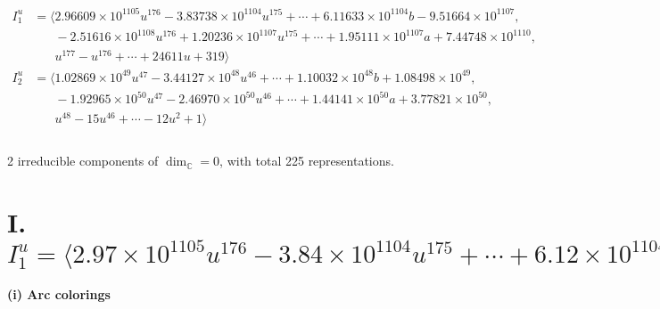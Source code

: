 \documentclass[1p]{elsarticle_modified}
\theoremstyle{definition}
\begin{document}
\begin{align*}
I^u_{1}&=\langle 
2.96609\times10^{1105} u^{176}-3.83738\times10^{1104} u^{175}+\cdots+6.11633\times10^{1104} b-9.51664\times10^{1107},\\
\phantom{I^u_{1}}&\phantom{= \langle  }-2.51616\times10^{1108} u^{176}+1.20236\times10^{1107} u^{175}+\cdots+1.95111\times10^{1107} a+7.44748\times10^{1110},\\
\phantom{I^u_{1}}&\phantom{= \langle  }u^{177}- u^{176}+\cdots+24611 u+319\rangle \\
I^u_{2}&=\langle 
1.02869\times10^{49} u^{47}-3.44127\times10^{48} u^{46}+\cdots+1.10032\times10^{48} b+1.08498\times10^{49},\\
\phantom{I^u_{2}}&\phantom{= \langle  }-1.92965\times10^{50} u^{47}-2.46970\times10^{50} u^{46}+\cdots+1.44141\times10^{50} a+3.77821\times10^{50},\\
\phantom{I^u_{2}}&\phantom{= \langle  }u^{48}-15 u^{46}+\cdots-12 u^2+1\rangle \\
\\
\end{align*}
\raggedright * 2 irreducible components of $\dim_{\mathbb{C}}=0$, with total 225 representations.\\
\newpage
\renewcommand{\arraystretch}{1}
\centering \section*{I. $I^u_{1}= \langle 2.97\times10^{1105} u^{176}-3.84\times10^{1104} u^{175}+\cdots+6.12\times10^{1104} b-9.52\times10^{1107},\;-2.52\times10^{1108} u^{176}+1.20\times10^{1107} u^{175}+\cdots+1.95\times10^{1107} a+7.45\times10^{1110},\;u^{177}- u^{176}+\cdots+24611 u+319 \rangle$}
\flushleft \textbf{(i) Arc colorings}\\
\end{document}
